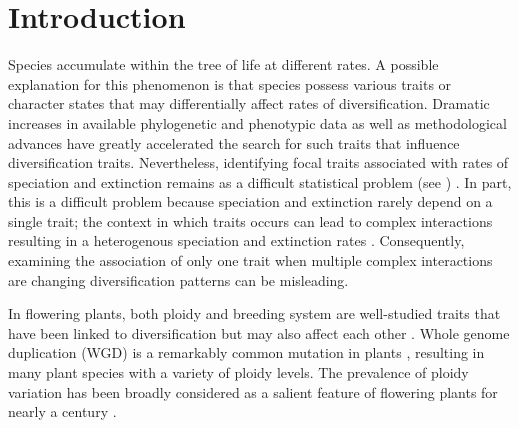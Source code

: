 \section{Introduction}


Species accumulate within the tree of life at different rates.
A possible explanation for this phenomenon is that species possess various traits or character states that may differentially affect rates of diversification. %
Dramatic increases in available phylogenetic and phenotypic data %
as well as methodological advances %
have greatly accelerated the search for such traits that influence diversification traits. Nevertheless, identifying focal traits associated with rates of speciation and extinction remains as a difficult statistical problem (see \citep{maddison_2015, rabosky_2015, moore_2016, fitzjohn_2009, goldberg_2012, beaulieu_2016, rabosky_2017}) . %
In part, this is a difficult problem because speciation and extinction rarely depend on a single trait; the context  in which traits occurs can lead to complex interactions resulting in a heterogenous speciation and extinction rates \citep{beaulieu_2016, caetano_2018, herrera_2018}. Consequently, examining the association of only one trait when multiple complex interactions are changing diversification patterns can be misleading.

In flowering plants, both ploidy and breeding system are well-studied traits that have been linked to diversification but may also affect each other \citep{stebbins1950}. 
Whole genome duplication (WGD) is a remarkably common mutation in plants \citep{husband_2013, zenilferguson_2017}, resulting in many plant species with a variety of ploidy levels. The prevalence of ploidy variation has been broadly considered as a salient feature of flowering plants for nearly a century \citep{stebbins1938}. 

